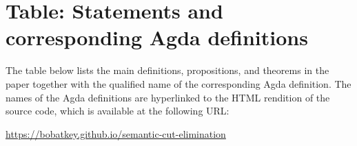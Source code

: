 \section{Table: Statements and corresponding Agda definitions}
\label{sec:table-of-statments}

The table below lists the main definitions, propositions, and theorems in the paper together with the qualified name of the corresponding Agda definition.
The names of the Agda definitions are hyperlinked to the HTML rendition of the source code, which is available at the following URL:
\begin{center}
  \url{https://bobatkey.github.io/semantic-cut-elimination}
\end{center}

\newcommand{\longtableheader}[1]{%
  \rowcolor{lightgray}
  \multicolumn{3}{l}{#1}}
\newcommand{\longtablemodule}[1]{%
  \multicolumn{3}{r}{%
    \small%
    (The following definitions can be found under \AgdaModuleRef{#1}.)}}

